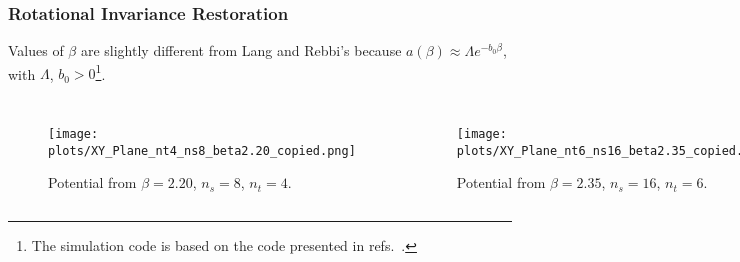 \documentclass{beamer}
\begin{document}
\begin{frame}
  \frametitle{Rotational Invariance Restoration}
  Values of $\beta$ are slightly different from Lang and Rebbi's because $a(\beta)\approx\Lambda e^{-b_0\beta}$, with $\Lambda$, $b_0>0$\footnote{The simulation code is based on the code presented in refs.~\cite{Panero:2009tv,Mykkanen:2012ri}.}.
  \vspace{-0.5\baselineskip}
  \begin{columns}
    \begin{figure}
      \texttt{[image: plots/XY\_Plane\_nt4\_ns8\_beta2.20\_copied.png]}
      \caption{Potential from $\beta=2.20$, $n_s=8$, $n_t=4$.}
    \end{figure}
    \begin{figure}
      \texttt{[image: plots/XY\_Plane\_nt6\_ns16\_beta2.35\_copied.png]}
      \caption{Potential from $\beta=2.35$, $n_s=16$, $n_t=6$.}
    \end{figure}
  \end{columns}
\end{frame}
\end{document}
